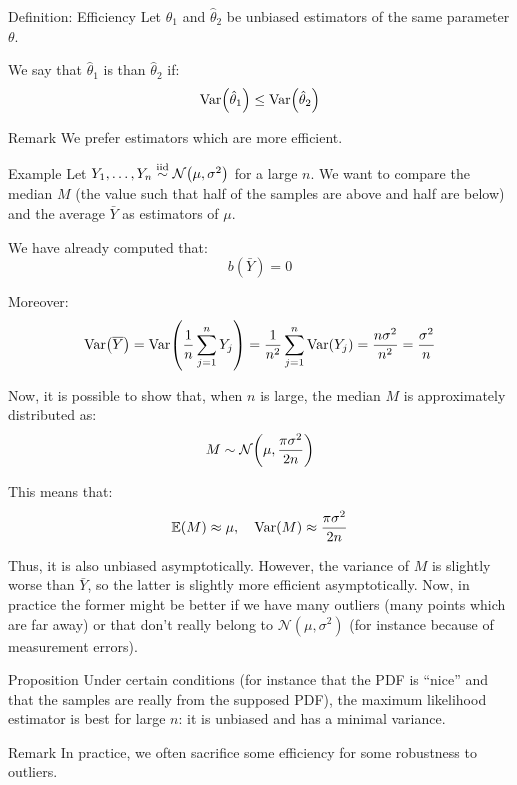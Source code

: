 \documentclass[a4paper]{article}
\begin{document}
\begin{parag}{Definition: Efficiency}
    Let $\hat{\theta}_1$ and $\hat{\theta}_2$ be unbiased estimators of the same parameter $\theta$. 
    
    We say that $\hat{\theta}_1$ is  than $\hat{\theta}_2$ if: 
    \[\Var\left(\hat{\theta}_1\right) \leq \Var\left(\hat{\theta}_2\right)\]

    \begin{subparag}{Remark}
        We prefer estimators which are more efficient.
    \end{subparag}
\end{parag}

\begin{parag}{Example}
    Let $Y_1, \ldots, Y_n \iid \mathcal{N}\left(\mu, \sigma^2\right)$ for a large $n$. We want to compare the median $M$ (the value such that half of the samples are above and half are below) and the average $\bar{Y}$ as estimators of $\mu$.

    We have already computed that: 
    \[b\left(\bar{Y}\right) = 0\]
    
    Moreover: 
    \[\Var\left(\bar{Y}\right) = \Var\left(\frac{1}{n} \sum_{j=1}^{n} Y_j\right) = \frac{1}{n^2} \sum_{j=1}^{n} \Var\left(Y_j\right) = \frac{n\sigma^2}{n^2} = \frac{\sigma^2}{n}\]
    
    Now, it is possible to show that, when $n$ is large, the median $M$ is approximately distributed as: 
    \[M \followsdistr \mathcal{N}\left(\mu, \frac{\pi \sigma^2}{2 n}\right)\]

    This means that: 
    \[\exval\left(M\right) \approx \mu, \mathspace \Var\left(M\right) \approx \frac{\pi \sigma^2}{2 n}\]
    
    Thus, it is also unbiased asymptotically. However, the variance of $M$ is slightly worse than $\bar{Y}$, so the latter is slightly more efficient asymptotically. Now, in practice the former might be better if we have many outliers (many points which are far away) or that don't really belong to $\mathcal{N}\left(\mu, \sigma^2\right)$ (for instance because of measurement errors).
\end{parag}

\begin{parag}{Proposition}
    Under certain conditions (for instance that the PDF is ``nice'' and that the samples are really from the supposed PDF), the maximum likelihood estimator is best for large $n$: it is unbiased and has a minimal variance.

    \begin{subparag}{Remark}
        In practice, we often sacrifice some efficiency for some robustness to outliers.
    \end{subparag}
\end{parag}
\end{document}
